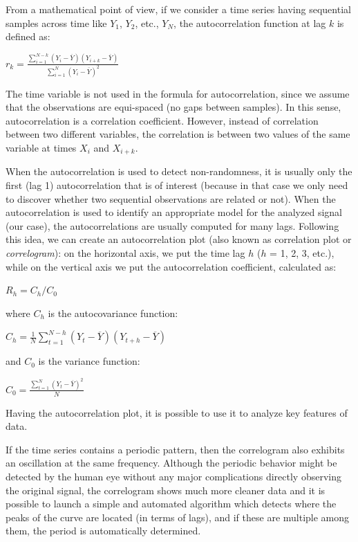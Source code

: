 \documentclass[12pt,a4paper,cucitura]{toptesi}
\begin{document}
From a mathematical point of view, if we consider a time series having sequential samples across time like $Y_1$, $Y_2$, etc., $Y_N$, the autocorrelation function at lag $k$ is defined as:

\begin{center}
\Large
$r_k = \frac{\sum_{i=1}^{N-k}{(Y_i - \overline{Y})(Y_{i+k} - \overline{Y})}}{\sum_{i=1}^{N}{(Y_i - \overline{Y})^2}}$
\end{center}

The time variable is not used in the formula for autocorrelation, since we assume that the observations are equi-spaced (no gaps between samples).
In this sense, autocorrelation is a correlation coefficient. However, instead of correlation between two different variables, the correlation is between two values of the same variable at times $X_i$ and $X_{i+k}$.

When the autocorrelation is used to detect non-randomness, it is usually only the first (lag 1) autocorrelation that is of interest (because in that case we only need to discover whether two sequential observations are related or not).
When the autocorrelation is used to identify an appropriate model for the analyzed signal (our case), the autocorrelations are usually computed for many lags.
Following this idea, we can create an autocorrelation plot (also known as correlation plot or \emph{correlogram}): on the horizontal axis, we put the time lag $h$ ($h$ = 1, 2, 3, etc.), while on the vertical axis we put the autocorrelation coefficient, calculated as:

\begin{center}
\Large
$R_h = C_h/C_0$
\end{center}

where $C_h$ is the autocovariance function:

\begin{center}
\Large
$C_h = \frac{1}{N}\sum_{t=1}^{N-h}{(Y_t - \overline{Y})(Y_{t+h} - \overline{Y})}$
\end{center}

and $C_0$ is the variance function:

\begin{center}
\Large
$C_0 = \frac{\sum_{t=1}^{N}{(Y_t - \overline{Y})^2}}{N}$
\end{center}

Having the autocorrelation plot, it is possible to use it to analyze key features of data.

If the time series contains a periodic pattern, then the correlogram also exhibits an oscillation at the same frequency.
Although the periodic behavior might be detected by the human eye without any major complications directly observing the original signal, the correlogram shows much more cleaner data and it is possible to launch a simple and automated algorithm which detects where the peaks of the curve are located (in terms of lags), and if these are multiple among them, the period is automatically determined.
\end{document}
